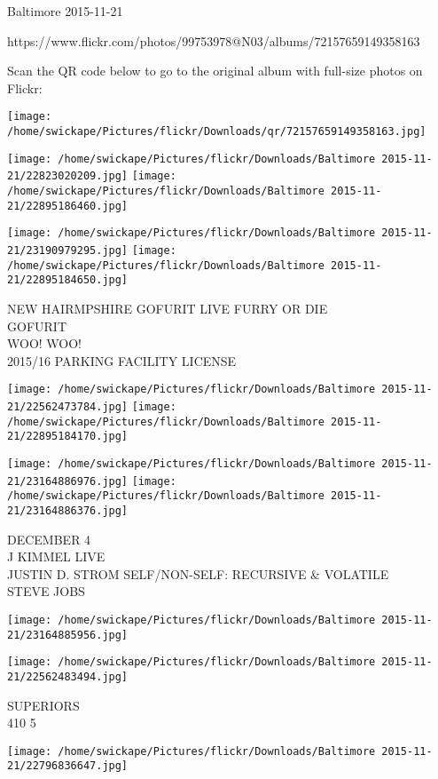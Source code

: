 \documentclass[10pt,letterpaper]{article}
\begin{document}
Baltimore 2015-11-21

https://www.flickr.com/photos/99753978@N03/albums/72157659149358163

Scan the QR code below to go to the original album with full-size photos on Flickr:

\texttt{[image: /home/swickape/Pictures/flickr/Downloads/qr/72157659149358163.jpg]}
\pagebreak

\texttt{[image: /home/swickape/Pictures/flickr/Downloads/Baltimore 2015-11-21/22823020209.jpg]}
\texttt{[image: /home/swickape/Pictures/flickr/Downloads/Baltimore 2015-11-21/22895186460.jpg]}

\texttt{[image: /home/swickape/Pictures/flickr/Downloads/Baltimore 2015-11-21/23190979295.jpg]}
\texttt{[image: /home/swickape/Pictures/flickr/Downloads/Baltimore 2015-11-21/22895184650.jpg]}

NEW HAIRMPSHIRE GOFURIT LIVE FURRY OR DIE\\
GOFURIT\\
WOO!  WOO!\\
2015/16 PARKING FACILITY LICENSE
\pagebreak

\texttt{[image: /home/swickape/Pictures/flickr/Downloads/Baltimore 2015-11-21/22562473784.jpg]}
\texttt{[image: /home/swickape/Pictures/flickr/Downloads/Baltimore 2015-11-21/22895184170.jpg]}

\texttt{[image: /home/swickape/Pictures/flickr/Downloads/Baltimore 2015-11-21/23164886976.jpg]}
\texttt{[image: /home/swickape/Pictures/flickr/Downloads/Baltimore 2015-11-21/23164886376.jpg]}

DECEMBER 4\\
J KIMMEL LIVE\\
JUSTIN D. STROM SELF/NON{-}SELF: RECURSIVE \& VOLATILE\\
STEVE JOBS
\pagebreak

\texttt{[image: /home/swickape/Pictures/flickr/Downloads/Baltimore 2015-11-21/23164885956.jpg]}

\vspace{0.25in}
\texttt{[image: /home/swickape/Pictures/flickr/Downloads/Baltimore 2015-11-21/22562483494.jpg]}

SUPERIORS\\
410 5
\pagebreak

\texttt{[image: /home/swickape/Pictures/flickr/Downloads/Baltimore 2015-11-21/22796836647.jpg]}
\end{document}

